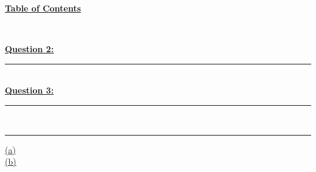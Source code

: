 \documentclass[12pt]{article}
\begin{document}
\begin{center}
	\hypertarget{toc}{\LARGE \noindent \underline{\textbf{Table of Contents}}}\\
\end{center}

\noindent \hyperlink{2}{\textbf{Question 2:}}
\vspace{1mm}
\hrule
\vspace{1mm} \leavevmode \\

\noindent \hyperlink{3}{\textbf{Question 3:}}
\vspace{1mm}
\hrule
\vspace{1mm} \leavevmode \\

\vspace{1mm}
\hrule
\vspace{1mm}
\noindent\hyperlink{4.1}{(a)}\\
\hyperlink         {4.2}{(b)}\\
\end{document}
